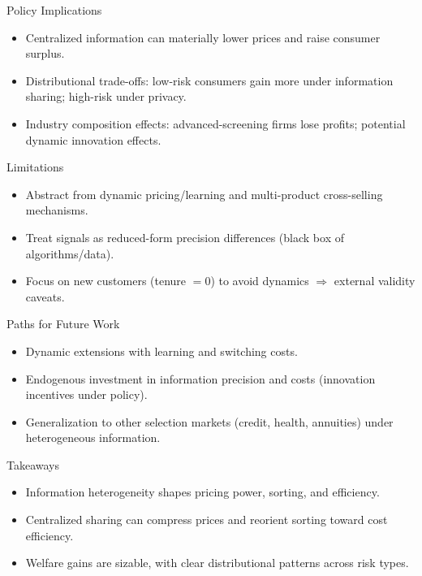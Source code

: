 \documentclass[11pt]{beamer}
\begin{document}
\begin{frame}{Policy Implications}
\justifying
\begin{itemize}
  \item Centralized information can materially lower prices and raise consumer surplus.
  \item Distributional trade-offs: low-risk consumers gain more under information sharing; high-risk under privacy.
  \item Industry composition effects: advanced-screening firms lose profits; potential dynamic innovation effects.
\end{itemize}
\end{frame}

\begin{frame}{Limitations}
\justifying
\begin{itemize}
  \item Abstract from dynamic pricing/learning and multi-product cross-selling mechanisms.
  \item Treat signals as reduced-form precision differences (black box of algorithms/data).
  \item Focus on new customers (tenure $=0$) to avoid dynamics $\Rightarrow$ external validity caveats.
\end{itemize}
\end{frame}

\begin{frame}{Paths for Future Work}
\justifying
\begin{itemize}
  \item Dynamic extensions with learning and switching costs.
  \item Endogenous investment in information precision and costs (innovation incentives under policy).
  \item Generalization to other selection markets (credit, health, annuities) under heterogeneous information.
\end{itemize}
\end{frame}

\begin{frame}{Takeaways}
\justifying
\begin{itemize}
  \item Information heterogeneity shapes pricing power, sorting, and efficiency.
  \item Centralized sharing can compress prices and reorient sorting toward cost efficiency.
  \item Welfare gains are sizable, with clear distributional patterns across risk types.
\end{itemize}
\end{frame}
\end{document}
